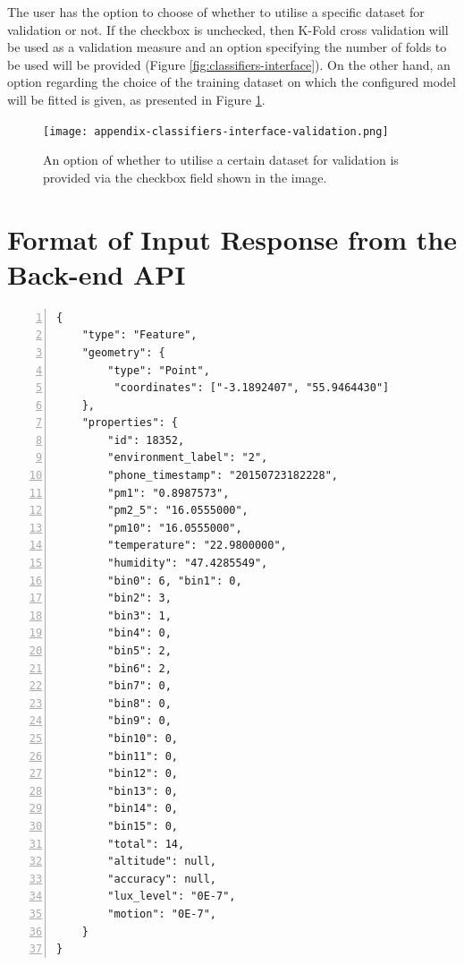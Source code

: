 \documentclass[bsc,frontabs,twoside,singlespacing, parskip,deptreport]{infthesis}     %
\begin{document}
\begin{appendices}
The user has the option to choose of whether to utilise a specific dataset for validation or not. If the checkbox is unchecked, then K-Fold cross validation will be used as a validation measure and an option specifying the number of folds to be used will be provided (Figure \ref{fig:classifiers-interface}). On the other hand, an option regarding the choice of the training dataset on which the configured model will be fitted is given, as presented in Figure \ref{fig:validation-checkbox}.

\begin{figure}[h!]
  \center
  \texttt{[image: appendix-classifiers-interface-validation.png]}
  \caption{An option of whether to utilise a certain dataset for validation is provided via the checkbox field shown in the image.}
  \label{fig:validation-checkbox}
\end{figure}

\section{Format of Input Response from the Back-end API}

\begin{lstlisting}[numbers=left, caption={This code listing represents an example of a data input in GeoJSON format, which is sent from the back-end to the front-end of the data visualization tool after performing urban environments clustering. The "environment\_label" key represents the id corresponding to a certain urban environment}]
{
	"type": "Feature", 
	"geometry": {
		"type": "Point",
		 "coordinates": ["-3.1892407", "55.9464430"]
	},
	"properties": {
		"id": 18352, 
		"environment_label": "2", 
		"phone_timestamp": "20150723182228",
		"pm1": "0.8987573",
		"pm2_5": "16.0555000", 
		"pm10": "16.0555000",
		"temperature": "22.9800000", 
		"humidity": "47.4285549",
		"bin0": 6, "bin1": 0, 
		"bin2": 3, 
		"bin3": 1, 
		"bin4": 0, 
		"bin5": 2, 
		"bin6": 2, 
		"bin7": 0, 
		"bin8": 0, 
		"bin9": 0, 
		"bin10": 0, 
		"bin11": 0, 
		"bin12": 0, 
		"bin13": 0, 
		"bin14": 0, 
		"bin15": 0, 
		"total": 14, 
		"altitude": null, 
		"accuracy": null, 
		"lux_level": "0E-7", 
		"motion": "0E-7", 
	}
}
\end{lstlisting}


\end{appendices}
\end{document}
